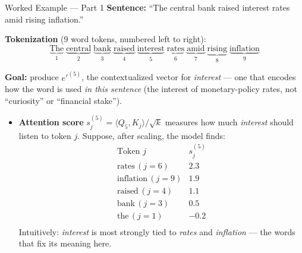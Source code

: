 \documentclass[10pt,english,aspectratio=169]{beamer}
\begin{document}
\begin{frame}{Worked Example --- Part 1}
\small
\textbf{Sentence:} ``The central bank raised interest rates amid rising inflation.''

\smallskip
\textbf{Tokenization} (9 word tokens, numbered left to right):
\[
\underbrace{\text{The}}_{1}\;\underbrace{\text{central}}_{2}\;\underbrace{\text{bank}}_{3}\;\underbrace{\text{raised}}_{4}\;\underbrace{\text{interest}}_{5}\;\underbrace{\text{rates}}_{6}\;\underbrace{\text{amid}}_{7}\;\underbrace{\text{rising}}_{8}\;\underbrace{\text{inflation}}_{9}
\]

\smallskip
\textbf{Goal:} produce $e'^{(5)}$, the contextualized vector for \emph{interest} --- one that encodes how the word is used \emph{in this sentence} (the interest of monetary-policy rates, not ``curiosity'' or ``financial stake'').

\smallskip
\begin{itemize}
\item \textbf{Attention score} $s_{j}^{(5)} = \langle Q_{5}, K_{j}\rangle / \sqrt{k}$ measures how much \emph{interest} should listen to token $j$. Suppose, after scaling, the model finds:
\[
\begin{array}{l|c}
   \text{Token } j & s_{j}^{(5)} \\
   \hline
   \text{rates}\,(j=6) & 2.3 \\
   \text{inflation}\,(j=9) & 1.9 \\
   \text{raised}\,(j=4) & 1.1 \\
   \text{bank}\,(j=3) & 0.5 \\
   \text{the}\,(j=1) & -0.2 \\
\end{array}
\]
Intuitively: \emph{interest} is most strongly tied to \emph{rates} and \emph{inflation} --- the words that fix its meaning here.
\end{itemize}
\end{frame}
\end{document}
